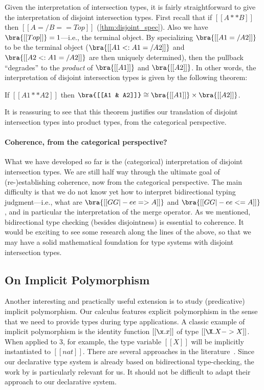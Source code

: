 Given the interpretation of intersection types, it is fairly straightforward to
give the interpretation of disjoint intersection types. First recall that if
$[[A ** B]]$ then $[[ A =/ B == Top ]]$ (\cref{thm:disjoint_spec}). Also we have
$\bra{[[Top]]} = 1$---i.e., the terminal object. By specializing $\bra{[[A1 =/ A2]]}$ to be the terminal object
($\bra{[[A1 <: A1 =/ A2]]}$ and $\bra{[[A2 <: A1 =/ A2]]}$ are then uniquely
determined), then the pullback ``degrades'' to the \textit{product} of
$\bra{[[A1]]}$ and $\bra{[[A2]]}$. In other words, the interpretation of
disjoint intersection types is given by the following theorem:
\begin{theorem}
  If $[[A1 ** A2]]$ then $\bra{[[A1 & A2]]} \cong \bra{[[A1]]} \times \bra{[[A2]]} $.
\end{theorem}
\begin{remark}
It is reassuring to see that this theorem justifies our translation of
disjoint intersection types into product types, from the categorical
perspective.
\end{remark}



\paragraph{Coherence, from the categorical perspective?}

What we have developed so far is the (categorical) interpretation of disjoint intersection
types. We are still half way through the ultimate goal of (re-)establishing
coherence, now from the categorical perspective. The main difficulty is that we
do not know yet how to interpret bidirectional typing judgment---i.e., what are
$\bra{[[GG |- ee => A]]}$ and $\bra{[[GG |- ee <= A]]}$, and in particular the
interpretation of the merge operator. As we mentioned, bidirectional type checking
(besides disjointness) is essential to coherence. It would be exciting to see
some research along the lines of the above, so that we may have a solid
mathematical foundation for type systems with disjoint intersection types.

\subsection{On Implicit Polymorphism}
\label{sec:implicit}

Another interesting and practically useful extension is to study (predicative)
implicit polymorphism. Our \fnamee calculus features explicit polymorphism in the sense that
we need to provide types during type applications. A classic example of implicit
polymorphism is the identity function $[[\x . x]]$ of type $[[\X . X -> X]]$.
When applied to $3$, for example, the type variable $[[X]]$ will be implicitly
instantiated to $[[nat]]$. There are several approaches in the
literature~\citep{odersky1996putting, dunfield2013complete, jones2007practical}.
Since our declarative type system is already based on bidirectional
type-checking, the work by \citet{dunfield2013complete} is particularly relevant
for us. It should not be difficult to adapt their approach to our declarative
system.

